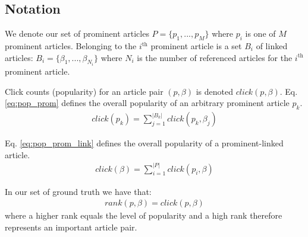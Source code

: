 \subsection{Notation}
We denote our set of prominent articles $P = \{ p_1, ..., p_M \}$ where $p_i$ is one of $M$ prominent articles. Belonging to the $i^{\text{th}}$ prominent article is a set $B_i$ of linked articles: $B_i = \{ \beta_1, ..., \beta_{N_i} \}$ where $N_i$ is the number of referenced articles for the $i^{\text{th}}$ prominent article.

Click counts (popularity) for an article pair $(p, \beta)$ is denoted $click(p, \beta)$. Eq. \ref{eq:pop_prom} defines the overall popularity of an arbitrary prominent article $p_k$.
\begin{align}
click(p_k) = \sum\limits_{j=1}^{|B_k|} click(p_k, \beta_j)
\label{eq:pop_prom}
\end{align}

Eq. \ref{eq:pop_prom_link} defines the overall popularity of a prominent-linked article.
\begin{align}
click(\beta) = \sum\limits_{i=1}^{|P|} click(p_i, \beta)
\label{eq:pop_prom_link}
\end{align}

In our set of ground truth we have that:
\begin{align}
rank(p, \beta) = click(p, \beta)
\label{eq:pop_rank_relation_for_gt}
\end{align}
where a higher rank equals the level of popularity and a high rank therefore represents an important article pair.